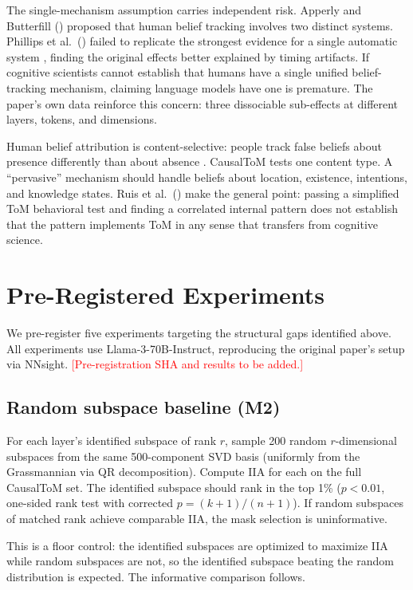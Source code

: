 \documentclass[11pt]{article}
\begin{document}
The single-mechanism assumption carries independent risk. Apperly and Butterfill (\citeyear{apperly2009humans}) proposed that human belief tracking involves two distinct systems. Phillips et al.\ (\citeyear{phillips2015second}) failed to replicate the strongest evidence for a single automatic system \citep{kovacs2010social}, finding the original effects better explained by timing artifacts. If cognitive scientists cannot establish that humans have a single unified belief-tracking mechanism, claiming language models have one is premature. The paper's own data reinforce this concern: three dissociable sub-effects at different layers, tokens, and dimensions.

Human belief attribution is content-selective: people track false beliefs about presence differently than about absence \citep{schuwerk2015implicit}. CausalToM tests one content type. A ``pervasive'' mechanism should handle beliefs about location, existence, intentions, and knowledge states. Ruis et al.\ (\citeyear{ruis2025reevaluating}) make the general point: passing a simplified ToM behavioral test and finding a correlated internal pattern does not establish that the pattern implements ToM in any sense that transfers from cognitive science.


\section{Pre-Registered Experiments}
\label{sec:experiments}

We pre-register five experiments targeting the structural gaps identified above. All experiments use Llama-3-70B-Instruct, reproducing the original paper's setup via NNsight. \textcolor{red}{[Pre-registration SHA and results to be added.]}

\subsection{Random subspace baseline (M2)}

For each layer's identified subspace of rank $r$, sample 200 random $r$-dimensional subspaces from the same 500-component SVD basis (uniformly from the Grassmannian via QR decomposition). Compute IIA for each on the full CausalToM set. The identified subspace should rank in the top 1\% ($p < 0.01$, one-sided rank test with corrected $p = (k + 1)/(n + 1)$). If random subspaces of matched rank achieve comparable IIA, the mask selection is uninformative.

This is a floor control: the identified subspaces are optimized to maximize IIA while random subspaces are not, so the identified subspace beating the random distribution is expected. The informative comparison follows.
\end{document}
